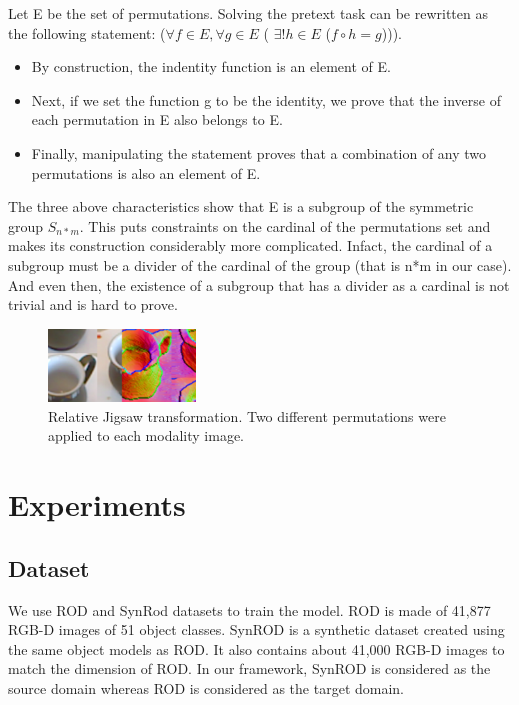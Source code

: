 \documentclass[conference]{IEEEtran}
\begin{document}
Let E be the set of permutations. Solving the pretext task can be rewritten as the following statement: ($\forall f \in E, \forall g \in E$ ( $\exists!h \in E$  ($f \circ h=g$))). \\
\begin{itemize}
\item By construction, the indentity function is an element of E. 
\item Next, if we set the function g to be the identity, we prove that the inverse of each permutation in E also belongs to E. 
\item Finally, manipulating the statement proves that a combination of any two permutations is also an element of E. 
\end{itemize}
The three above characteristics show that E is a subgroup of the symmetric group $S_{n*m}$. This puts constraints on the cardinal of the permutations set and makes its construction considerably more complicated. Infact, the cardinal of a subgroup must be a divider of the cardinal of the group (that is n*m in our case). And even then, the existence of a subgroup that has a divider as a cardinal is not trivial and is hard to prove.

\begin{figure}[htbp]
\centerline{\includegraphics[width=0.35\textwidth]{relative.png}}
\caption{Relative Jigsaw transformation. Two different permutations were applied to each modality image.}
\label{fig}
\end{figure}






\section{Experiments}
\subsection{Dataset}
We use ROD and SynRod datasets to train the model. ROD is made of 41,877 RGB-D images of 51 object classes. SynROD is a synthetic dataset created using the same object models as ROD. It also contains about 41,000 RGB-D images to match the dimension of ROD. In our framework, SynROD is considered as the source domain whereas ROD is considered as the target domain.
\end{document}
